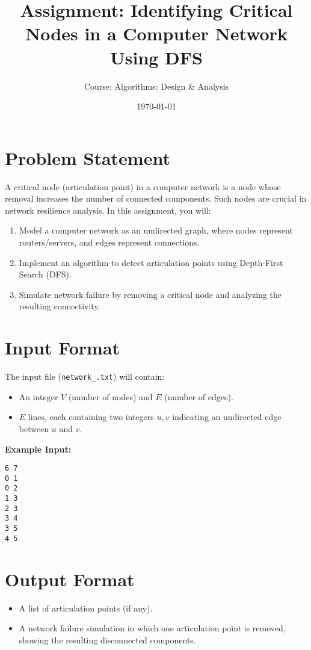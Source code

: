 \documentclass{article}
\title{\textbf{Assignment: Identifying Critical Nodes in a Computer Network Using DFS}}
\author{Course: Algorithms: Design \& Analysis}
\date{\today}
\begin{document}
\maketitle

\section{Problem Statement}
A critical node (articulation point) in a computer network is a node whose removal increases the number of connected components. Such nodes are crucial in network resilience analysis. In this assignment, you will:

\begin{enumerate}
    \item Model a computer network as an undirected graph, where nodes represent routers/servers, and edges represent connections.
    \item Implement an algorithm to detect articulation points using Depth-First Search (DFS).
    \item Simulate network failure by removing a critical node and analyzing the resulting connectivity.
\end{enumerate}

\section{Input Format}
The input file (\texttt{network\_<file number>.txt}) will contain:
\begin{itemize}
    \item An integer \(V\) (number of nodes) and \(E\) (number of edges).
    \item \(E\) lines, each containing two integers \(u, v\) indicating an undirected edge between \(u\) and \(v\).
\end{itemize}

\textbf{Example Input:}
\begin{verbatim}
6 7
0 1
0 2
1 3
2 3
3 4
3 5
4 5
\end{verbatim}

\section{Output Format}
\begin{itemize}
    \item A list of articulation points (if any).
    \item A network failure simulation in which one articulation point is removed, showing the resulting disconnected components.
\end{itemize}
\end{document}
